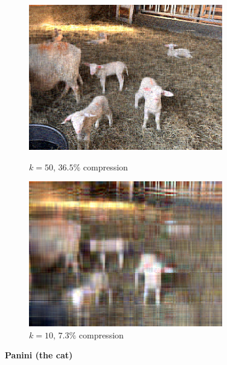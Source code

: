 \begin{figure}[H]
  \centering
  \begin{minipage}[b]{0.4\textwidth}
    \includegraphics[width=\textwidth]{images/compressed_sheep_50.png}
    \caption{$k = 50$, $36.5\%$ compression}
  \end{minipage}
  \hfill
  \begin{minipage}[b]{0.4\textwidth}
    \includegraphics[width=\textwidth]{images/compressed_sheep_10.png}
    \caption{$k = 10$, $7.3\%$ compression}
  \end{minipage}
\end{figure}

\begin{center}
    \textbf{Panini (the cat)}
\end{center}

